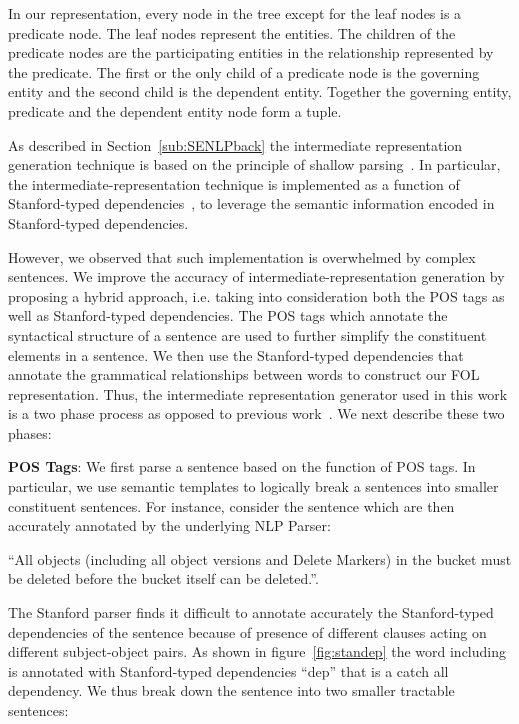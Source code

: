 In our representation, every node in the tree except for the leaf nodes is a predicate node. 
The leaf nodes represent the entities.
The children of the predicate nodes are the participating entities in the relationship represented by the predicate.
The first or the only child of a predicate node is the governing entity and the second child is the dependent entity.
Together the governing entity, predicate and the dependent entity node form a tuple.  


As described in Section~\ref{sub:SENLPback} the intermediate representation generation technique is based on the principle of shallow parsing~\cite{Branimir2000}. 
In particular, the intermediate-representation technique is implemented as a function of Stanford-typed dependencies~\cite{Marneffe06LREC,Marneffe08COLING,KleinNIPS03}, to leverage the semantic information encoded in Stanford-typed dependencies.


However, we observed that such implementation is overwhelmed by complex sentences.
We improve the accuracy of intermediate-representation generation by proposing a hybrid approach, i.e. taking into consideration both the POS tags as well as Stanford-typed dependencies.
The POS tags which annotate the syntactical structure of a sentence are used to further simplify the constituent elements in a sentence. 
We then use the Stanford-typed dependencies that annotate the grammatical relationships between words to construct our FOL representation.
Thus, the intermediate representation generator used in this work is a two phase process as opposed to previous work~\cite{pandita12:inferring, pandita13:WHYPER}. 
We next describe these two phases:

\textbf{POS Tags}: We first parse a sentence based on the function of POS tags. 
In particular, we use semantic templates to logically break a sentences into smaller constituent sentences. 
For instance, consider the sentence which are then accurately annotated by the underlying NLP Parser:

\begin{center}
\scriptsize``All objects (including all object versions and Delete Markers) in the bucket must be deleted before the bucket itself can be deleted.''. \normalsize
\end{center}

The Stanford parser finds it difficult to annotate accurately the Stanford-typed dependencies of the sentence because of presence of different clauses acting on different subject-object pairs.
As shown in figure~\ref{fig:standep} the word including is annotated with Stanford-typed dependencies ``dep'' that is a catch all dependency. We thus break down the sentence into two smaller tractable sentences:

